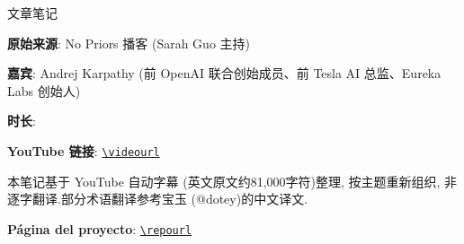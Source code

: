 
\begin{titlepage}
\centering
{\Large 文章笔记\par}
\vspace{1.2cm}
{\huge\bfseries \notetitle\par}
\vspace{0.8cm}
{\large \noteauthors\par}
\vspace{0.3cm}
{\large \notedate\par}
\vspace{1.5cm}

\vfill
\begin{tcolorbox}[width=0.9\textwidth, colback=black!2!white, colframe=black!60, sharp corners]
\textbf{原始来源}: No Priors 播客 (Sarah Guo 主持)\par
\textbf{嘉宾}: Andrej Karpathy (前 OpenAI 联合创始成员、前 Tesla AI 总监、Eureka Labs 创始人)\par
\textbf{时长}: \videoduration\par
\textbf{YouTube 链接}: \href{\videourl}{\nolinkurl{\videourl}}\par
\vspace{0.3cm}
{\small 本笔记基于 YouTube 自动字幕 (英文原文约81,000字符)整理, 按主题重新组织, 非逐字翻译.部分术语翻译参考宝玉 (@dotey)的中文译文.}\par
\textbf{Página del proyecto}: \href{\repourl}{\nolinkurl{\repourl}}\par
\end{tcolorbox}
\end{titlepage}

\tableofcontents
\newpage


